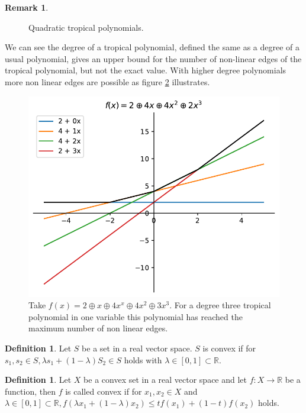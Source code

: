 \documentclass{article}
\theoremstyle{definition}
\newtheorem{definition}[theorem]{Definition}
\newtheorem{remark}[theorem]{Remark}
\begin{document}
\begin{remark}
\begin{figure}[h]
\caption{Quadratic tropical polynomials.}
\label{fig:image2}
\end{figure}

We can see the degree of a tropical polynomial, defined the same as a degree of a usual polynomial, gives an upper bound for the number of non-linear edges of the tropical polynomial, but not the exact value. With higher degree polynomials more non linear edges are possible as figure \ref{fig:trop_qub} illustrates.


\begin{figure}[h]
\centering
\includegraphics[scale=0.75]{graphics/third_trop_pol.pdf}
\caption{Take $f(x)=2 \oplus x \oplus 4x^{x} \oplus 4x^{2} \oplus 3x^{3}$. For a degree three tropical polynomial in one variable this polynomial has reached the maximum number of non linear edges.}
\label{fig:trop_qub}
\end{figure}
\end{remark}

\begin{definition}
Let $S$ be a set in a real vector space. $S$ is convex if for $s_{1}, s_{2} \in S, \lambda s_{1} + (1-\lambda) S_{2} \in S$ holds with $\lambda \in [0,1] \subset \mathbb{R}$.
\end{definition}

\begin{definition}
Let $X$ be a convex set in a real vector space and let $f:X \to \mathbb{R}$ be a function, then $f$ is called convex if for $x_{1}, x_{2} \in X$ and $\lambda \in [0,1] \subset \mathbb{R}, f(\lambda x_{1} + (1-\lambda)x_{2}) \leq tf(x_{1}) + (1-t)f(x_{2})$ holds.
\end{definition}
\end{document}
